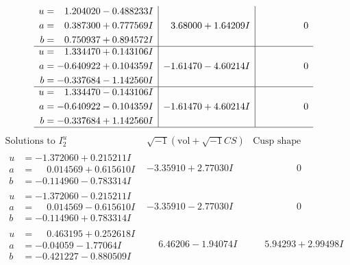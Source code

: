 \documentclass[1p]{elsarticle_modified}
\theoremstyle{definition}
\newcommand{\I}{\sqrt{-1}}
\begin{document}
$$\begin{array}{c|c|c}
\begin{aligned}
u &= \phantom{-}1.204020 - 0.488233 I \\
a &= \phantom{-}0.387300 + 0.777569 I \\
b &= \phantom{-}0.750937 + 0.894572 I\end{aligned}
 & \phantom{-}3.68000 + 1.64209 I & \phantom{-0.000000 } 0 \\ \hline\begin{aligned}
u &= \phantom{-}1.334470 + 0.143106 I \\
a &= -0.640922 + 0.104359 I \\
b &= -0.337684 - 1.142560 I\end{aligned}
 & -1.61470 - 4.60214 I & \phantom{-0.000000 } 0 \\ \hline\begin{aligned}
u &= \phantom{-}1.334470 - 0.143106 I \\
a &= -0.640922 - 0.104359 I \\
b &= -0.337684 + 1.142560 I\end{aligned}
 & -1.61470 + 4.60214 I & \phantom{-0.000000 } 0\\
 \hline 
 \end{array}$$\newpage$$\begin{array}{c|c|c}  
\text{Solutions to }I^u_{2}& \I (\text{vol} + \sqrt{-1}CS) & \text{Cusp shape}\\
 \hline 
\begin{aligned}
u &= -1.372060 + 0.215211 I \\
a &= \phantom{-}0.014569 + 0.615610 I \\
b &= -0.114960 - 0.783314 I\end{aligned}
 & -3.35910 + 2.77030 I & \phantom{-0.000000 } 0 \\ \hline\begin{aligned}
u &= -1.372060 - 0.215211 I \\
a &= \phantom{-}0.014569 - 0.615610 I \\
b &= -0.114960 + 0.783314 I\end{aligned}
 & -3.35910 - 2.77030 I & \phantom{-0.000000 } 0 \\ \hline\begin{aligned}
u &= \phantom{-}0.463195 + 0.252618 I \\
a &= -0.04059 - 1.77064 I \\
b &= -0.421227 - 0.880509 I\end{aligned}
 & \phantom{-}6.46206 - 1.94074 I & \phantom{-}5.94293 + 2.99498 I \\ \hline\begin{aligned}

\end{aligned}
\end{array}$$
\end{document}
